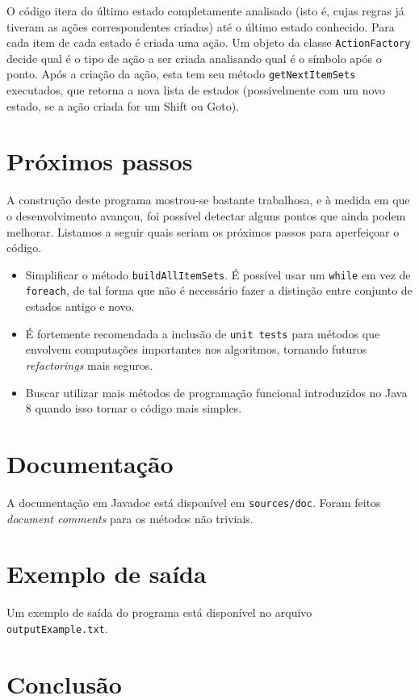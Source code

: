 \documentclass[11pt]{article}
\begin{document}
O código itera do último estado completamente analisado (isto é, cujas
regras já tiveram as ações correspondentes criadas) até o último estado conhecido.
Para cada item de cada estado é criada uma ação. Um objeto da classe
\texttt{ActionFactory} decide qual é o tipo de ação a ser criada analisando qual é o
símbolo após o ponto. Após a criação da ação, esta tem seu método
\texttt{getNextItemSets} executados, que retorna a nova lista de estados (possivelmente com
um novo estado, se a ação criada for um Shift ou Goto).

\section{Próximos passos}
\label{sec:orgheadline15}
A construção deste programa mostrou-se bastante trabalhosa, e à medida em que o
desenvolvimento avançou, foi possível detectar alguns pontos que ainda podem
melhorar. Listamos a seguir quais seriam os próximos passos para aperfeiçoar o código. 
\begin{itemize}
\item Simplificar o método \texttt{buildAllItemSets}. É possível usar um \texttt{while} em vez de
\texttt{foreach}, de tal forma que não é necessário fazer a distinção entre conjunto
de estados antigo e novo.
\item É fortemente recomendada a inclusão de \texttt{unit tests} para métodos que envolvem
computações importantes nos algoritmos, tornando futuros \emph{refactorings} mais seguros.
\item Buscar utilizar mais métodos de programação funcional introduzidos no Java 8
quando isso tornar o código mais simples.
\end{itemize}
\section{Documentação}
\label{sec:orgheadline16}
A documentação em Javadoc está disponível em \texttt{sources/doc}. Foram feitos
\emph{document comments} para os métodos não triviais.
\section{Exemplo de saída}
\label{sec:orgheadline17}
Um exemplo de saída do programa está disponível no arquivo \texttt{outputExample.txt}.

\section{Conclusão}
\label{sec:orgheadline18}
\end{document}
